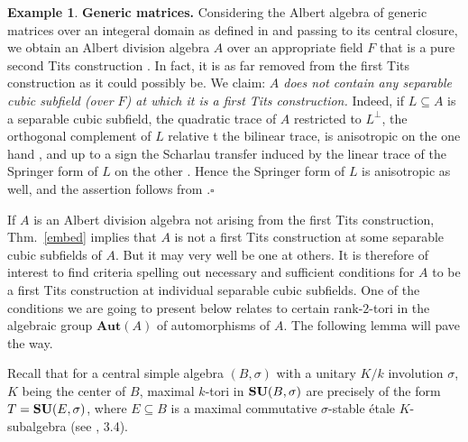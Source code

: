 \documentclass{amsart}
\theoremstyle{definition} %
\newtheorem{eg}[equation]{Example}
\theoremstyle{remark} %
\newcommand{\bfAut}{\mathbf{Aut}}
\renewcommand{\:}{\colon\,}
\numberwithin{equation}{section}
\begin{document}
\begin{eg} \label{e.ALGEMA}
\textbf{Generic matrices.} Considering the Albert algebra of generic matrices over an integeral domain as defined in \cite{MR1699633} and passing to its central closure, we obtain an Albert division algebra $A$ over an appropriate field $F$ that is a pure second Tits construction \cite[Thm.~1]{MR1699633}. In fact, it is as far removed from the first Tits construction as it could possibly be. We claim: \emph{$A$ does not contain any separable cubic subfield (over $F$) at which it is a first Tits construction.} Indeed, if $L \subseteq A$ is a separable cubic subfield, the quadratic trace of $A$ restricted to $L^\perp$, the orthogonal complement of $L$ relative t the bilinear trace, is anisotropic on the one hand \cite[Thm.~2]{MR1699633}, and up to a sign the Scharlau transfer induced by the linear trace of the Springer form of $L$ on the other \cite[Exc.~42.16~(a)]{MR4806163}. Hence the Springer form of $L$ is anisotropic as well, and the assertion follows from \cite[Thm.~4.4]{MR734841}.\hfill $\square$  
\end{eg}

If $A$ is an Albert division algebra not arising from the first Tits construction, Thm.~\ref{embed} implies that $A$ is not a first Tits construction at some separable cubic subfields of $A$. But it may very well be one at others. It is therefore of interest to find criteria spelling out necessary and sufficient conditions for $A$ to be a first Tits construction at individual separable cubic subfields. One of the conditions we are going to present below relates to certain rank-$2$-tori in the algebraic group $\bfAut(A)$ of automorphisms of $A$. The following lemma will pave the way. 

Recall that for a central simple algebra $(B,\sigma)$ with a unitary $K/k$ involution $\sigma$, $K$ being the center of $B$, maximal $k$-tori in ${\bf SU}(B,\sigma)$ are precisely of the form $T={\bf SU}(E,\sigma)$, where $E\subseteq B$ is a maximal commutative $\sigma$-stable \'{e}tale $K$-subalgebra (see \cite{MR1081540}, 3.4).
\end{document}

